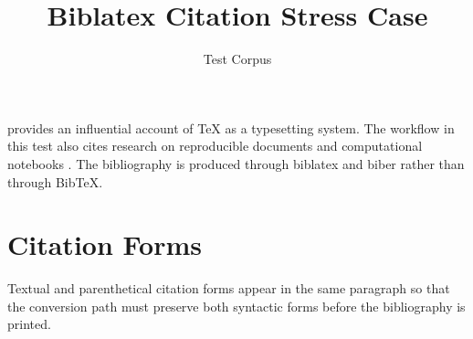 \documentclass[11pt]{article}
\title{Biblatex Citation Stress Case}
\author{Test Corpus}
\date{}
\begin{document}
\maketitle

\textcite{knuth1984texbook} provides an influential account of TeX as a
typesetting system. The workflow in this test also cites research on reproducible
documents \autocite{gentzkow2014code} and computational notebooks
\autocite{kluyver2016jupyter}. The bibliography is produced through biblatex and
biber rather than through BibTeX.

\section{Citation Forms}

Textual and parenthetical citation forms appear in the same paragraph so that
the conversion path must preserve both syntactic forms before the bibliography is
printed.

\printbibliography
\end{document}
